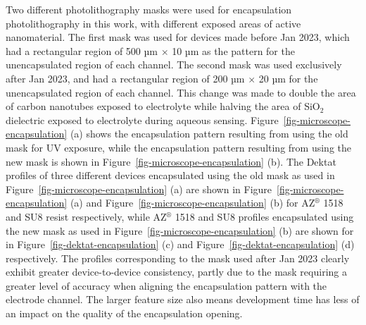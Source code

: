 \documentclass[
  a4paper,
]{scrbook}
\begin{document}
Two different photolithography masks were used for encapsulation
photolithography in this work, with different exposed areas of active
nanomaterial. The first mask was used for devices made before Jan 2023,
which had a rectangular region of 500 µm \(\times\) 10 µm as the pattern
for the unencapsulated region of each channel. The second mask was used
exclusively after Jan 2023, and had a rectangular region of 200 µm
\(\times\) 20 µm for the unencapsulated region of each channel. This
change was made to double the area of carbon nanotubes exposed to
electrolyte while halving the area of SiO\(_2\) dielectric exposed to
electrolyte during aqueous sensing.
Figure~\ref{fig-microscope-encapsulation} (a) shows the encapsulation
pattern resulting from using the old mask for UV exposure, while the
encapsulation pattern resulting from using the new mask is shown in
Figure~\ref{fig-microscope-encapsulation} (b). The Dektat profiles of
three different devices encapsulated using the old mask as used in
Figure~\ref{fig-microscope-encapsulation} (a) are shown in
Figure~\ref{fig-microscope-encapsulation} (a) and
Figure~\ref{fig-microscope-encapsulation} (b) for AZ\(^\circledR\) 1518
and SU8 resist respectively, while AZ\(^\circledR\) 1518 and SU8
profiles encapsulated using the new mask as used in
Figure~\ref{fig-microscope-encapsulation} (b) are shown for in
Figure~\ref{fig-dektat-encapsulation} (c) and
Figure~\ref{fig-dektat-encapsulation} (d) respectively. The profiles
corresponding to the mask used after Jan 2023 clearly exhibit greater
device-to-device consistency, partly due to the mask requiring a greater
level of accuracy when aligning the encapsulation pattern with the
electrode channel. The larger feature size also means development time
has less of an impact on the quality of the encapsulation opening.
\end{document}
